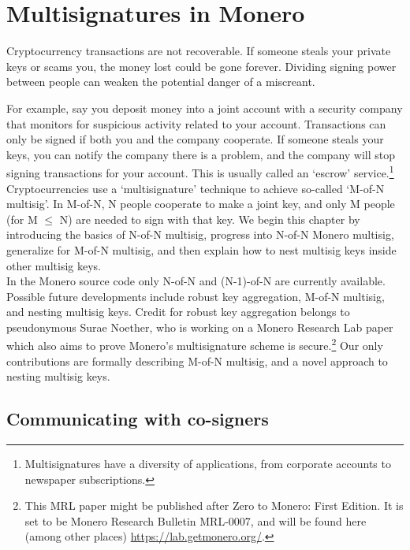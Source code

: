 \chapter{Multisignatures in Monero}
\label{chapter:multisignatures}

Cryptocurrency transactions are not recoverable. If someone steals your private keys or scams you, the money lost could be gone forever. Dividing signing power between people can weaken the potential danger of a miscreant.

For example, say you deposit money into a joint account with a security company that monitors for suspicious activity related to your account. Transactions can only be signed if both you and the company cooperate. If someone steals your keys, you can notify the company there is a problem, and the company will stop signing transactions for your account. This is usually called an `escrow' service.\footnote{Multisignatures have a diversity of applications, from corporate accounts to newspaper subscriptions.}\\

Cryptocurrencies use a `multisignature' technique to achieve so-called `M-of-N multisig'. In M-of-N, N people cooperate to make a joint key, and only M people (for M $\leq$ N) are needed to sign with that key. We begin this chapter by introducing the basics of N-of-N multisig, progress into N-of-N Monero multisig, generalize for M-of-N multisig, and then explain how to nest multisig keys inside other multisig keys.\\

In the Monero source code only N-of-N and (N-1)-of-N are currently available. Possible future developments include robust key aggregation, M-of-N multisig, and nesting multisig keys. Credit for robust key aggregation belongs to pseudonymous Surae Noether, who is working on a Monero Research Lab paper which also aims to prove Monero's multisignature scheme is secure.\footnote{This MRL paper might be published after Zero to Monero: First Edition. It is set to be Monero Research Bulletin MRL-0007, and will be found here (among other places) \url{https://lab.getmonero.org/}.} Our only contributions are formally describing M-of-N multisig, and a novel approach to nesting multisig keys.



\section{Communicating with co-signers}
\label{sec:communicating}

